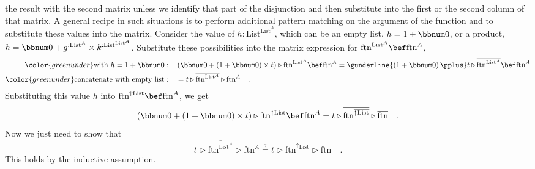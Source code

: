 the result with the second matrix unless we identify that part of
the disjunction and then substitute into the first or the second column
of that matrix. A general recipe in such situations is to perform
additional pattern matching on the argument of the function and to
substitute these values into the matrix. Consider the value of $h:\text{List}^{\text{List}^{A}}$,
which can be an empty list, $h=1+\bbnum 0$, or a product, $h=\bbnum 0+g^{:\text{List}^{A}}\times k^{:\text{List}^{\text{List}^{A}}}$.
Substitute these possibilities into the matrix expression for $\text{ftn}^{\text{List}^{A}}\bef\text{ftn}^{A}$,
\begin{align*}
{\color{greenunder}\text{with }h=1+\bbnum 0:}\quad & \left(\bbnum 0+\left(1+\bbnum 0\right)\times t\right)\triangleright\text{ftn}^{\text{List}^{A}}\bef\text{ftn}^{A}=\gunderline{\left(1+\bbnum 0\right)\pplus}t\triangleright\overline{\text{ftn}^{\text{List}^{A}}}\bef\text{ftn}^{A}\\
{\color{greenunder}\text{concatenate with empty list}:}\quad & =t\triangleright\overline{\text{ftn}^{\text{List}^{A}}}\triangleright\text{ftn}^{A}\quad.
\end{align*}
Substituting this value $h$ into $\text{ftn}^{\uparrow\text{List}}\bef\text{ftn}^{A}$,
we get 
\[
\left(\bbnum 0+\left(1+\bbnum 0\right)\times t\right)\triangleright\text{ftn}^{\uparrow\text{List}}\bef\text{ftn}^{A}=t\triangleright\overline{\text{ftn}^{\overline{\uparrow\text{List}}}}\triangleright\overline{\text{ftn}}\quad.
\]
Now we just need to show that
\[
t\triangleright\overline{\text{ftn}^{\text{List}^{A}}}\triangleright\text{ftn}^{A}\overset{?}{=}t\triangleright\overline{\text{ftn}^{\overline{\uparrow\text{List}}}}\triangleright\overline{\text{ftn}}\quad.
\]
This holds by the inductive assumption.

